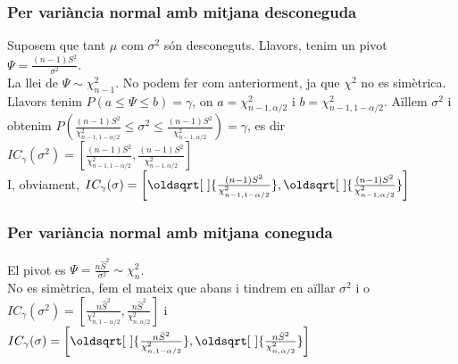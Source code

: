 \documentclass[a4paper]{sciposter}
\renewcommand*{\sqrt}[2][\ ]{\oldsqrt[#1]{#2} }
\begin{document}
\begin{multicols}{3}
\subsubsection{Per variància normal amb mitjana desconeguda}
Suposem que tant $\mu$ com $\sigma^2$ són desconeguts. Llavors, tenim un pivot $\Psi = \frac{(n-1)S^2}{\sigma^2}$.\\
La llei de $\Psi \sim \chi^2_{n-1}$. No podem fer com anteriorment, ja que $\chi^2$ no es simètrica.\\
Llavors tenim $P(a\leq\Psi\leq b) = \gamma$, on $a = \chi^2_{n-1,\alpha/2}$ i $b = \chi^2_{n-1,1-\alpha/2}$.
Aïllem $\sigma^2$ i obtenim $P\left(\frac{(n-1)S^2}{\chi^2_{n-1,1-\alpha/2}} \leq \sigma^2 \leq \frac{(n-1)S^2}{\chi^2_{n-1,\alpha/2}}\right) = \gamma$, es dir $IC_\gamma(\sigma^2) = \left[\frac{(n-1)S^2}{\chi^2_{n-1,1-\alpha/2}}, \frac{(n-1)S^2}{\chi^2_{n-1,\alpha/2}}\right]$\\
I, obviament, $IC_\gamma(\sigma) = \left[\sqrt{\frac{(n-1)S^2}{\chi^2_{n-1,1-\alpha/2}}}, \sqrt{\frac{(n-1)S^2}{\chi^2_{n-1,\alpha/2}}}\right]$
\subsubsection{Per variància normal amb mitjana coneguda}
El pivot es $\Psi = \frac{n\hat{S}^2}{\sigma^2} \sim \chi^2_n$.\\
No es simètrica, fem el mateix que abans i tindrem en aïllar $\sigma^2$ i o $IC_\gamma(\sigma^2) = \left[\frac{n\hat{S}^2}{\chi^2_{n,1-\alpha/2}}, \frac{n\hat{S}^2}{\chi^2_{n,\alpha/2}}\right]$ i $IC_\gamma(\sigma) = \left[\sqrt{\frac{n\hat{S}^2}{\chi^2_{n,1-\alpha/2}}}, \sqrt{\frac{n\hat{S}^2}{\chi^2_{n,\alpha/2}}}\right]$

\end{multicols}
\end{document}
